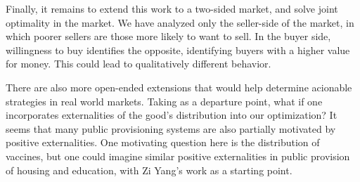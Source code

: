 \documentclass[AER]{AEA}
\begin{document}
Finally, it remains to extend this work to a two-sided market, and solve joint optimality in the market. We have analyzed only the seller-side of the market, in which poorer sellers are those more likely to want to sell. In the buyer side, willingness to buy identifies the opposite, identifying buyers with a higher value for money. This could lead to qualitatively different behavior.

There are also more open-ended extensions that would help determine acionable strategies in real world markets. Taking \cite{akbarpour-2020} as a departure point, what if one incorporates externalities of the good's distribution into our optimization? It seems that many public provisioning systems are also partially motivated by positive externalities. One motivating question here is the distribution of vaccines, but one could imagine similar positive externalities in public provision of housing and education, with Zi Yang's work as a starting point. %




\end{document}
